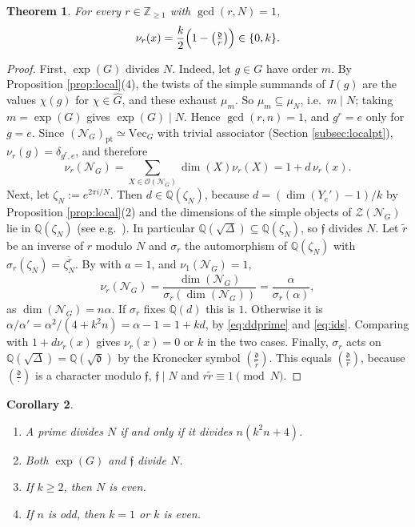 \documentclass[10pt]{article}
\theoremstyle{plain}
\newtheorem{theorem}{Theorem}[section]
\newtheorem{corollary}[theorem]{Corollary}
\theoremstyle{definition}
\theoremstyle{plain}
\newcommand{\Jac}[2]{\left(\tfrac{#1}{#2}\right)}
\begin{document}
\begin{theorem}\label{thm:nugeneral}
For every $r\in\mathbb{Z}_{\geq1}$ with $\gcd(r,N)=1$,
\[
  \nu_r(x)=\frac k2\Bigl(1-\Jac{\mathfrak{d}}{r}\Bigr)\in\{0,k\}.
\]
\end{theorem}

\begin{proof}
First, $\exp(G)$ divides $N$. Indeed, let $g\in G$ have order $m$. By Proposition \ref{prop:local}(4), the twists of the simple summands of $I(g)$ are the values $\chi(g)$ for $\chi\in\widehat{G}$, and these exhaust $\mu_m$. So $\mu_m\subseteq\mu_N$, i.e.\ $m\mid N$; taking $m=\exp(G)$ gives $\exp(G)\mid N$. Hence $\gcd(r,n)=1$, and $g^r=e$ only for $g=e$. Since $(\mathcal{N}_G)_\mathrm{pt}\simeq\mathrm{Vec}_G$ with trivial associator (Section \ref{subsec:localpt}), $\nu_r(g)=\delta_{g^r,e}$, and therefore
\[
  \nu_r(\mathcal{N}_G)=\sum_{X\in\mathcal{O}(\mathcal{N}_G)}\dim(X)\nu_r(X)=1+d\,\nu_r(x).
\]
Next, let $\zeta_N:=e^{2\pi i/N}$. Then $d\in\mathbb{Q}(\zeta_N)$, because $d=(\dim(Y_e')-1)/k$ by Proposition \ref{prop:local}(2) and the dimensions of the simple objects of $\mathcal{Z}(\mathcal{N}_G)$ lie in $\mathbb{Q}(\zeta_N)$ (see e.g.\ \cite[Section 2]{MR3486174}). In particular $\mathbb{Q}(\sqrt\Delta)\subseteq\mathbb{Q}(\zeta_N)$, so $\mathfrak{f}$ divides $N$. Let $\tilde r$ be an inverse of $r$ modulo $N$ and $\sigma_r$ the automorphism of $\mathbb{Q}(\zeta_N)$ with $\sigma_r(\zeta_N)=\zeta_N^{\tilde r}$. By \cite[Theorem 4.4]{MR3997136} with $a=1$, and $\nu_1(\mathcal{N}_G)=1$,
\[
  \nu_r(\mathcal{N}_G)=\frac{\dim(\mathcal{N}_G)}{\sigma_r(\dim(\mathcal{N}_G))}=\frac{\alpha}{\sigma_r(\alpha)},
\]
as $\dim(\mathcal{N}_G)=n\alpha$. If $\sigma_r$ fixes $\mathbb{Q}(d)$ this is $1$. Otherwise it is $\alpha/\alpha'=\alpha^2/(4+k^2n)=\alpha-1=1+kd$, by \eqref{eq:ddprime} and \eqref{eq:ids}. Comparing with $1+d\nu_r(x)$ gives $\nu_r(x)=0$ or $k$ in the two cases. Finally, $\sigma_r$ acts on $\mathbb{Q}(\sqrt\Delta)=\mathbb{Q}(\sqrt{\mathfrak{d}})$ by the Kronecker symbol $\Jac{\mathfrak{d}}{\tilde r}$. This equals $\Jac{\mathfrak{d}}{r}$, because $\Jac{\mathfrak{d}}{\cdot}$ is a character modulo $\mathfrak{f}$, $\mathfrak{f}\mid N$ and $r\tilde r\equiv1\pmod N$.
\end{proof}

\begin{corollary}\label{cor:fsexp}
\leavevmode
\begin{enumerate}
\item A prime divides $N$ if and only if it divides $n(k^2n+4)$.
\item Both $\exp(G)$ and $\mathfrak{f}$ divide $N$.
\item If $k\geq2$, then $N$ is even.
\item If $n$ is odd, then $k=1$ or $k$ is even.
\end{enumerate}
\end{corollary}
\end{document}
